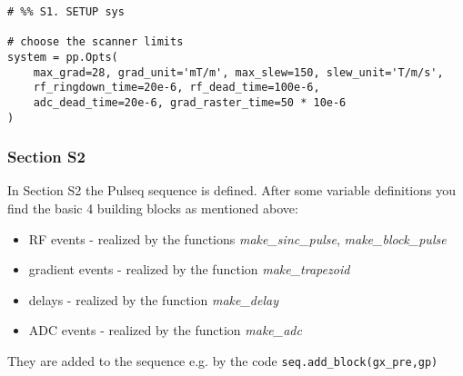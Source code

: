 \documentclass[a4paper,12pt]{extarticle}
\begin{document}
\begin{verbatim}
# %% S1. SETUP sys

# choose the scanner limits
system = pp.Opts(
    max_grad=28, grad_unit='mT/m', max_slew=150, slew_unit='T/m/s',
    rf_ringdown_time=20e-6, rf_dead_time=100e-6,
    adc_dead_time=20e-6, grad_raster_time=50 * 10e-6
)

\end{verbatim}

\subsubsection{Section S2}
In Section S2 the Pulseq sequence is defined. After some variable definitions you find the basic 4 building blocks as mentioned above:
\begin{itemize}
\item RF events - realized by the functions \emph{make\_sinc\_pulse}, \emph{make\_block\_pulse}
\item gradient events - realized by the function \emph{make\_trapezoid}
\item delays - realized by the function \emph{make\_delay}
\item ADC events  - realized by the function \emph{make\_adc}
\end{itemize}

They are added to the sequence e.g. by the code \texttt{seq.add_block(gx_pre,gp)}
\end{document}

